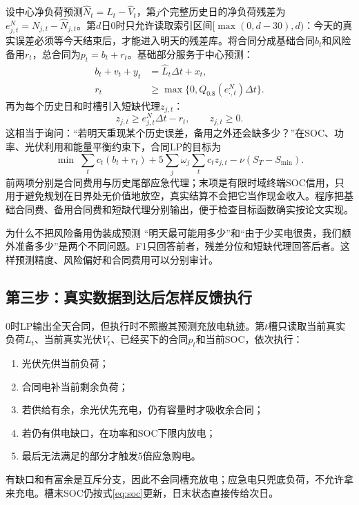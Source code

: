 \documentclass[UTF8,fontset=fandol,a4paper,11pt]{ctexart}
\begin{document}
设中心净负荷预测\(\widehat N_t=\widehat L_t-\widehat V_t\)，第\(j\)个完整历史日的净负荷残差为\(e^N_{j,t}=N_{j,t}-\widehat N_{j,t}\)。第\(d\)日0时只允许读取索引区间\([\max(0,d-30),d)\)：今天的真实误差必须等今天结束后，才能进入明天的残差库。将合同分成基础合同\(b_t\)和风险备用\(r_t\)，总合同为\(p_t=b_t+r_t\)。基础部分服务于中心预测：
\begin{align}
b_t+v_t+y_t&=\widehat L_t\Delta t+x_t,\label{eq:risk-base}\\
r_t&\ge\max\{0,Q_{0.8}(e^N_{\cdot,t})\Delta t\}.\label{eq:risk-floor}
\end{align}
再为每个历史日和时槽引入短缺代理\(z_{j,t}\)：
\begin{equation}
z_{j,t}\ge e^N_{j,t}\Delta t-r_t,\qquad z_{j,t}\ge0.
\label{eq:risk-shortfall}
\end{equation}
这相当于询问：“若明天重现某个历史误差，备用之外还会缺多少？”在SOC、功率、光伏利用和能量平衡约束下，合同LP的目标为
\begin{equation}
\min\;\sum_t c_t(b_t+r_t)+5\sum_j\omega_j\sum_t c_tz_{j,t}
-\nu(S_T-S_{\min}).
\label{eq:risk-objective}
\end{equation}
前两项分别是合同费用与历史尾部应急代理；末项是有限时域终端SOC信用，只用于避免规划在日界处无价值地放空，真实结算不会把它当作现金收入。程序把基础合同费、备用合同费和短缺代理分别输出，便于检查目标函数确实按论文实现。

\begin{plainbox}{为什么不把风险备用伪装成预测}
“明天最可能用多少”和“由于少买电很贵，我们额外准备多少”是两个不同问题。F1只回答前者，残差分位和短缺代理回答后者。这样预测精度、风险偏好和合同费用可以分别审计。
\end{plainbox}

\subsection{第三步：真实数据到达后怎样反馈执行}

0时LP输出全天合同，但执行时不照搬其预测充放电轨迹。第\(t\)槽只读取当前真实负荷\(L_t\)、当前真实光伏\(V_t\)、已经买下的合同\(p_t\)和当前SOC，依次执行：
\begin{enumerate}[label=（\arabic*）]
  \item 光伏先供当前负荷；
  \item 合同电补当前剩余负荷；
  \item 若供给有余，余光伏先充电，仍有容量时才吸收余合同；
  \item 若仍有供电缺口，在功率和SOC下限内放电；
  \item 最后无法满足的部分才触发5倍应急购电。
\end{enumerate}
有缺口和有富余是互斥分支，因此不会同槽充放电；应急电只兜底负荷，不允许拿来充电。槽末SOC仍按式\eqref{eq:soc}更新，日末状态直接传给次日。
\end{document}
